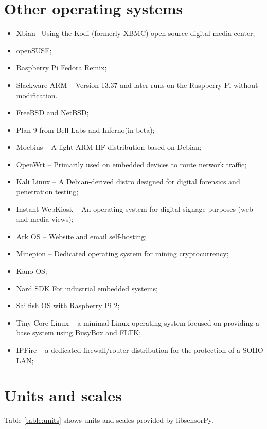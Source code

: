 \documentclass{acm_proc_article-sp}
\begin{document}


\appendix


\section{Other operating systems}\label{sec:RPiOS}
\begin{itemize}
\item Xbian– Using the Kodi (formerly XBMC) open source digital media center;
\item openSUSE;
\item Raspberry Pi Fedora Remix;
\item Slackware ARM – Version 13.37 and later runs on the Raspberry Pi without modification.
\item FreeBSD and NetBSD;
\item Plan 9 from Bell Labs and Inferno(in beta);
\item Moebius – A light ARM HF distribution based on Debian;
\item OpenWrt – Primarily used on embedded devices to route network traffic;
\item Kali Linux – A Debian-derived distro designed for digital forensics and penetration testing;
\item Instant WebKiosk – An operating system for digital signage purposes (web and media views);
\item Ark OS – Website and email self-hosting;
\item Minepion – Dedicated operating system for mining cryptocurrency;
\item Kano OS;
\item Nard SDK For industrial embedded systems;
\item Sailfish OS with Raspberry Pi 2;
\item Tiny Core Linux – a minimal Linux operating system focused on providing a base system using BusyBox and FLTK;
\item IPFire – a dedicated firewall/router distribution for the protection of a SOHO LAN;
\end{itemize}

\newpage

\section{Units and scales}\label{sec:Units}
Table \ref{table:units} shows units and scales provided by libsensorPy.
\end{document}

